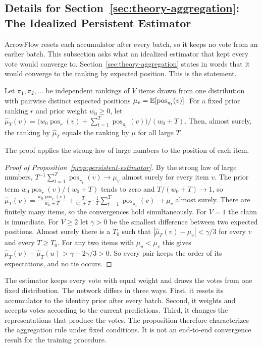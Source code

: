 \subsection{Details for Section~\ref*{sec:theory-aggregation}: The Idealized Persistent Estimator}\label{supp:persistent}

ArrowFlow resets each accumulator after every batch, so it keeps no vote from an earlier batch. This subsection asks what an idealized estimator that kept every vote would converge to. Section~\ref{sec:theory-aggregation} states in words that it would converge to the ranking by expected position. This is the statement.

\begin{proposition}\label{prop:persistent-estimator}
Let $\pi_1,\pi_2,\dots$ be independent rankings of $V$ items drawn from one distribution with pairwise distinct expected positions $\mu_v=\mathbb{E}[\operatorname{pos}_{\pi_t}(v)]$. For a fixed prior ranking $r$ and prior weight $w_0\ge0$, let $\hat\mu_T(v)=\bigl(w_0\operatorname{pos}_r(v)+\sum_{t=1}^{T}\operatorname{pos}_{\pi_t}(v)\bigr)/(w_0+T)$. Then, almost surely, the ranking by $\hat\mu_T$ equals the ranking by $\mu$ for all large $T$.
\end{proposition}

The proof applies the strong law of large numbers to the position of each item.

\begin{proof}[Proof of Proposition~\ref{prop:persistent-estimator}]
By the strong law of large numbers, $T^{-1}\sum_{t=1}^{T}\operatorname{pos}_{\pi_t}(v)\to\mu_v$ almost surely for every item $v$. The prior term $w_0\operatorname{pos}_r(v)/(w_0+T)$ tends to zero and $T/(w_0+T)\to1$, so $\hat\mu_T(v)=\frac{w_0\operatorname{pos}_r(v)}{w_0+T}+\frac{T}{w_0+T}\cdot\frac1T\sum_{t=1}^{T}\operatorname{pos}_{\pi_t}(v)\to\mu_v$ almost surely. There are finitely many items, so the convergences hold simultaneously. For $V=1$ the claim is immediate. For $V\ge2$ let $\gamma>0$ be the smallest difference between two expected positions. Almost surely there is a $T_0$ such that $|\hat\mu_T(v)-\mu_v|<\gamma/3$ for every $v$ and every $T\ge T_0$. For any two items with $\mu_u<\mu_v$ this gives $\hat\mu_T(v)-\hat\mu_T(u)>\gamma-2\gamma/3>0$. So every pair keeps the order of its expectations, and no tie occurs.
\end{proof}

The estimator keeps every vote with equal weight and draws the votes from one fixed distribution. The network differs in three ways. First, it resets its accumulator to the identity prior after every batch. Second, it weights and accepts votes according to the current predictions. Third, it changes the representations that produce the votes. The proposition therefore characterizes the aggregation rule under fixed conditions. It is not an end-to-end convergence result for the training procedure.

